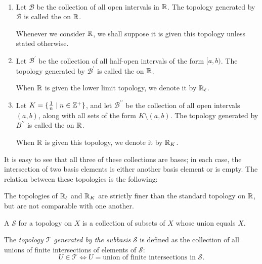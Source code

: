 \begin{definition} \
\begin{enumerate}[label=(\roman*)]
\item Let $\mathcal{B}$ be the collection of all open intervals in $\mathbb R$. The topology generated by $\mathcal{B}$ is called the  on $\mathbb R$.

Whenever we consider $\mathbb R$, we shall suppose it is given this topology unless stated otherwise. 

\item Let $\mathcal{B}^\prime$ be the collection of all half-open intervals of the form $[a,b)$. The topology generated by $\mathcal{B}^\prime$ is called the  on $\mathbb R$. 

When $\mathbb R$ is given the lower limit topology, we denote it by $\mathbb R_\ell$.

\item Let $K=\{\frac{1}{n}\mid n\in\mathbb Z^+\}$, and let $\mathcal{B}^{\prime\prime}$ be the collection of all open intervals $(a,b)$, along with all sets of the form $K\setminus(a,b)$. The topology generated by $B^{\prime\prime}$ is called the  on $\mathbb R$.

When $\mathbb R$ is given this topology, we denote it by $\mathbb R_K$.
\end{enumerate}
\end{definition}

It is easy to see that all three of these collections are bases; in each case, the intersection of two basis elements is either another basis element or is empty. The relation between these topologies is the following:

\begin{lemma}
The topologies of $\mathbb R_\ell$ and $\mathbb R_K$ are strictly finer than the standard topology on $\mathbb R$, but are not comparable with one another.
\end{lemma}

\begin{definition}[Subbasis]
A  $\mathcal{S}$ for a topology on $X$ is a collection of subsets of $X$ whose union equals $X$.

The \emph{topology $\mathcal{T}$ generated by the subbasis} $\mathcal{S}$ is defined as the collection of all unions of finite intersections of elements of $\mathcal{S}$:
\[U\in\mathcal{T}\iff U=\text{union of finite intersections in }\mathcal{S}.\]
\end{definition}

